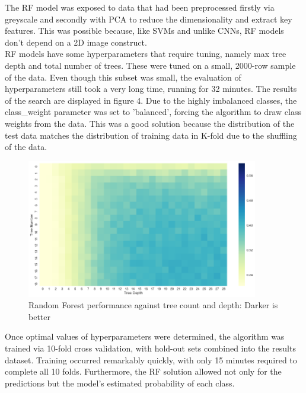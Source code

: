 \documentclass[12pt]{article}
\begin{document}
The RF model was exposed to data that had been preprocessed firstly via greyscale and secondly with PCA to reduce the dimensionality and extract key features. This was possible because, like SVMs and unlike CNNs, RF models don't depend on a 2D image construct.\\

RF models have some hyperparameters that require tuning, namely max tree depth and total number of trees. These were tuned on a small, 2000-row sample of the data. Even though this subset was small, the evaluation of hyperparameters still took a very long time, running for 32 minutes. The results of the search are displayed in figure 4.  Due to the highly imbalanced classes, the class\_weight parameter was set to 'balanced', forcing the algorithm to draw class weights from the data. This was a good solution because the distribution of the test data matches the distribution of training data in K-fold due to the shuffling of the data.
\\
\begin{figure}[h]
\caption{Random Forest performance against tree count and depth: Darker is better}
\centering
\includegraphics[width=0.9\textwidth]{images/random_forest_hyperparams.png}
\end{figure}


Once optimal values of hyperparameters were determined, the algorithm was trained via 10-fold cross validation, with hold-out sets combined into the results dataset. Training occurred remarkably quickly, with only 15 minutes required to complete all 10 folds. Furthermore, the RF solution allowed not only for the predictions but the model's estimated probability of each class.
\end{document}
